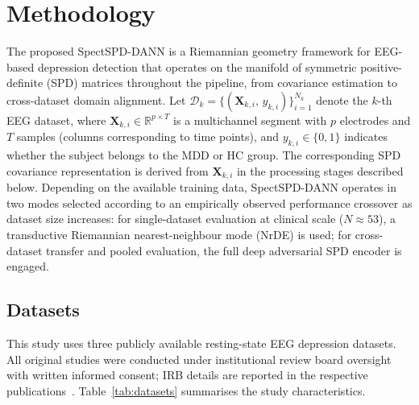 \section{Methodology}
\label{sec:methods}

The proposed SpectSPD-DANN is a Riemannian geometry framework for EEG-based
depression detection that operates on the manifold of symmetric positive-definite
(SPD) matrices throughout the pipeline, from covariance estimation to
cross-dataset domain alignment.
Let $\mathcal{D}_k = \{(\mathbf{X}_{k,i},\,y_{k,i})\}_{i=1}^{N_k}$ denote the
$k$-th EEG dataset, where $\mathbf{X}_{k,i}\!\in\!\mathbb{R}^{p\times T}$ is a
multichannel segment with $p$ electrodes and $T$ samples (columns corresponding
to time points), and $y_{k,i}\!\in\!\{0,1\}$ indicates whether the subject belongs
to the MDD or HC group.
The corresponding SPD covariance representation is derived from
$\mathbf{X}_{k,i}$ in the processing stages described below.
Depending on the available training data, SpectSPD-DANN operates in two modes
selected according to an empirically observed performance crossover as dataset
size increases: for single-dataset evaluation at clinical scale
($N\!\approx\!53$), a transductive Riemannian nearest-neighbour mode (NrDE)
is used; for cross-dataset transfer and pooled evaluation, the full deep
adversarial SPD encoder is engaged.

\subsection{Datasets}
\label{sec:datasets}

This study uses three publicly available resting-state EEG depression datasets.
All original studies were conducted under institutional review board oversight
with written informed consent; IRB details are reported in the respective
publications~\cite{cai2022modma,mumtaz2016mdd,cavanagh2021openneuro}.
Table~\ref{tab:datasets} summarises the study characteristics.

